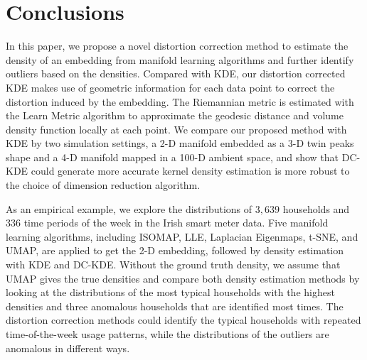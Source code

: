 \documentclass[11pt,a4paper,]{article}
\begin{document}
\hypertarget{conclusion}{%
\section{Conclusions}\label{conclusion}}

In this paper, we propose a novel distortion correction method to estimate the density of an embedding from manifold learning algorithms and further identify outliers based on the densities. Compared with KDE, our distortion corrected KDE makes use of geometric information for each data point to correct the distortion induced by the embedding. The Riemannian metric is estimated with the Learn Metric algorithm to approximate the geodesic distance and volume density function locally at each point. We compare our proposed method with KDE by two simulation settings, a 2-D manifold embedded as a 3-D twin peaks shape and a 4-D manifold mapped in a 100-D ambient space, and show that DC-KDE could generate more accurate kernel density estimation is more robust to the choice of dimension reduction algorithm.

As an empirical example, we explore the distributions of \(3,639\) households and \(336\) time periods of the week in the Irish smart meter data. Five manifold learning algorithms, including ISOMAP, LLE, Laplacian Eigenmaps, t-SNE, and UMAP, are applied to get the 2-D embedding, followed by density estimation with KDE and DC-KDE. Without the ground truth density, we assume that UMAP gives the true densities and compare both density estimation methods by looking at the distributions of the most typical households with the highest densities and three anomalous households that are identified most times. The distortion correction methods could identify the typical households with repeated time-of-the-week usage patterns, while the distributions of the outliers are anomalous in different ways.
\end{document}
